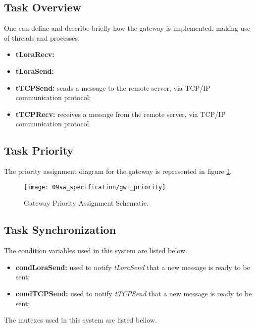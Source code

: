 \subsection{Task Overview}
One can define and describe briefly how the gateway is implemented, making use of threads and processes.

\begin{itemize}
	\item \textbf{tLoraRecv:}
	\item \textbf{tLoraSend:}
	\item \textbf{tTCPSend:} sends a message to the remote server, via TCP/IP communication protocol;
	\item \textbf{tTCPRecv:} receives a message from the remote server, via TCP/IP communication protocol.
\end{itemize}

\subsection{Task Priority}
The priority assignment diagram for the gateway is represented in figure \ref{fig:gwt_priority}.

\begin{figure}[H]
	\centering
	\texttt{[image: 09sw\_specification/gwt\_priority]}
	\caption{Gateway Priority Assignment Schematic.}
	\label{fig:gwt_priority}
\end{figure}

\subsection{Task Synchronization}

The condition variables used in this system are listed below.

\begin{itemize}
	\item \textbf{condLoraSend:} used to notify \textit{tLoraSend} that a new message is ready to be sent;
	\item \textbf{condTCPSend:} used to notify \textit{tTCPSend} that a new message is ready to be sent;
\end{itemize}

The mutexes used in this system are listed bellow.

